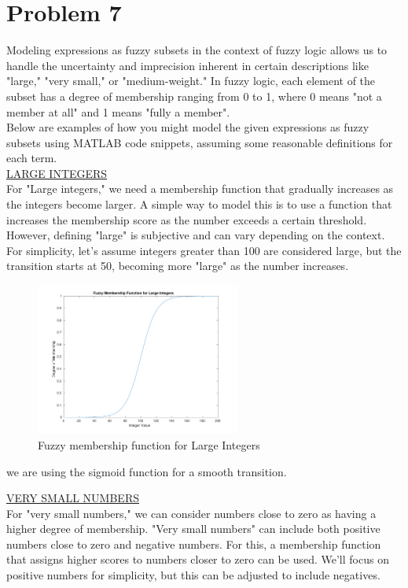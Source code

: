 \section{Problem 7}
Modeling expressions as fuzzy subsets in the context of fuzzy logic allows us to handle the uncertainty and imprecision inherent in certain descriptions like "large," "very small," or "medium-weight." In fuzzy logic, each element of the subset has a degree of membership ranging from 0 to 1, where 0 means "not a member at all" and 1 means "fully a member".\\
Below are examples of how you might model the given expressions as fuzzy subsets using MATLAB code snippets, assuming some reasonable definitions for each term.\\

\underline{LARGE INTEGERS}\\
For "Large integers," we need a membership function that gradually increases as the integers become larger. A simple way to model this is to use a function that increases the membership score as the number exceeds a certain threshold. However, defining "large" is subjective and can vary depending on the context. For simplicity, let's assume integers greater than 100 are considered large, but the transition starts at 50, becoming more "large" as the number increases.

\begin{figure}[h]
	\centering
	\includegraphics[width=0.6\textwidth]{../Problem 7/large_int.pdf}
	\caption{Fuzzy membership function for Large Integers}	
\end{figure}
we are using the sigmoid function for a smooth transition.
\vspace{5mm}

\underline{VERY SMALL NUMBERS}\\
For "very small numbers," we can consider numbers close to zero as having a higher degree of membership. "Very small numbers" can include both positive numbers close to zero and negative numbers. For this, a membership function that assigns higher scores to numbers closer to zero can be used. We'll focus on positive numbers for simplicity, but this can be adjusted to include negatives.

